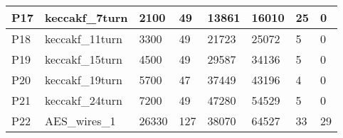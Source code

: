 \documentclass[pagesize, english, fontsize=10pt, DIV=25]{scrartcl}
\begin{document}
\begin{table}[]
{\begin{tabular}{|l|l|l|l|l|l|l|l|}
P17             & keccakf\_7turn                                & 2100                                                    & 49                                                           & 13861                                              & 16010                                                          & 25                                                              & 0                                                                   \\ \hline
P18             & keccakf\_11turn                               & 3300                                                    & 49                                                           & 21723                                              & 25072                                                          & 5                                                               & 0                                                                   \\ \hline
P19             & keccakf\_15turn                               & 4500                                                    & 49                                                           & 29587                                              & 34136                                                          & 5                                                               & 0                                                                   \\ \hline
P20             & keccakf\_19turn                               & 5700                                                    & 47                                                           & 37449                                              & 43196                                                          & 4                                                               & 0                                                                   \\ \hline
P21             & keccakf\_24turn                               & 7200                                                    & 49                                                           & 47280                                              & 54529                                                          & 5                                                               & 0                                                                   \\ \hline
P22             & AES\_wires\_1                                 & 26330                                                   & 127                                                          & 38070                                              & 64527                                                          & 33                                                              & 29                                                                  \\ \hline
\end{tabular}}
\end{table}
\end{document}
